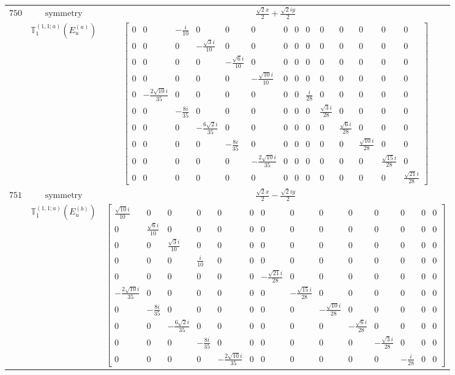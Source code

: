\documentclass[fleqn,8pt,landscape]{jsarticle}
\begin{document}
\begin{longtable}{ccc}
$ 750 $ & $ \text{symmetry} $ & $ \frac{\sqrt{2} x}{2} + \frac{\sqrt{2} i y}{2} $ \\
$  $ & $ \mathbb{T}_{1}^{(1,1;a)}(E_{u}^{(a)}) $ & $ \begin{bmatrix} 0 & 0 & - \frac{i}{10} & 0 & 0 & 0 & 0 & 0 & 0 & 0 & 0 & 0 & 0 & 0 \\ 0 & 0 & 0 & - \frac{\sqrt{3} i}{10} & 0 & 0 & 0 & 0 & 0 & 0 & 0 & 0 & 0 & 0 \\ 0 & 0 & 0 & 0 & - \frac{\sqrt{6} i}{10} & 0 & 0 & 0 & 0 & 0 & 0 & 0 & 0 & 0 \\ 0 & 0 & 0 & 0 & 0 & - \frac{\sqrt{10} i}{10} & 0 & 0 & 0 & 0 & 0 & 0 & 0 & 0 \\ 0 & - \frac{2 \sqrt{10} i}{35} & 0 & 0 & 0 & 0 & 0 & 0 & \frac{i}{28} & 0 & 0 & 0 & 0 & 0 \\ 0 & 0 & - \frac{8 i}{35} & 0 & 0 & 0 & 0 & 0 & 0 & \frac{\sqrt{3} i}{28} & 0 & 0 & 0 & 0 \\ 0 & 0 & 0 & - \frac{6 \sqrt{2} i}{35} & 0 & 0 & 0 & 0 & 0 & 0 & \frac{\sqrt{6} i}{28} & 0 & 0 & 0 \\ 0 & 0 & 0 & 0 & - \frac{8 i}{35} & 0 & 0 & 0 & 0 & 0 & 0 & \frac{\sqrt{10} i}{28} & 0 & 0 \\ 0 & 0 & 0 & 0 & 0 & - \frac{2 \sqrt{10} i}{35} & 0 & 0 & 0 & 0 & 0 & 0 & \frac{\sqrt{15} i}{28} & 0 \\ 0 & 0 & 0 & 0 & 0 & 0 & 0 & 0 & 0 & 0 & 0 & 0 & 0 & \frac{\sqrt{21} i}{28} \end{bmatrix} $ \\ \hline
$ 751 $ & $ \text{symmetry} $ & $ \frac{\sqrt{2} x}{2} - \frac{\sqrt{2} i y}{2} $ \\
$  $ & $ \mathbb{T}_{1}^{(1,1;a)}(E_{u}^{(b)}) $ & $ \begin{bmatrix} \frac{\sqrt{10} i}{10} & 0 & 0 & 0 & 0 & 0 & 0 & 0 & 0 & 0 & 0 & 0 & 0 & 0 \\ 0 & \frac{\sqrt{6} i}{10} & 0 & 0 & 0 & 0 & 0 & 0 & 0 & 0 & 0 & 0 & 0 & 0 \\ 0 & 0 & \frac{\sqrt{3} i}{10} & 0 & 0 & 0 & 0 & 0 & 0 & 0 & 0 & 0 & 0 & 0 \\ 0 & 0 & 0 & \frac{i}{10} & 0 & 0 & 0 & 0 & 0 & 0 & 0 & 0 & 0 & 0 \\ 0 & 0 & 0 & 0 & 0 & 0 & - \frac{\sqrt{21} i}{28} & 0 & 0 & 0 & 0 & 0 & 0 & 0 \\ - \frac{2 \sqrt{10} i}{35} & 0 & 0 & 0 & 0 & 0 & 0 & - \frac{\sqrt{15} i}{28} & 0 & 0 & 0 & 0 & 0 & 0 \\ 0 & - \frac{8 i}{35} & 0 & 0 & 0 & 0 & 0 & 0 & - \frac{\sqrt{10} i}{28} & 0 & 0 & 0 & 0 & 0 \\ 0 & 0 & - \frac{6 \sqrt{2} i}{35} & 0 & 0 & 0 & 0 & 0 & 0 & - \frac{\sqrt{6} i}{28} & 0 & 0 & 0 & 0 \\ 0 & 0 & 0 & - \frac{8 i}{35} & 0 & 0 & 0 & 0 & 0 & 0 & - \frac{\sqrt{3} i}{28} & 0 & 0 & 0 \\ 0 & 0 & 0 & 0 & - \frac{2 \sqrt{10} i}{35} & 0 & 0 & 0 & 0 & 0 & 0 & - \frac{i}{28} & 0 & 0 \end{bmatrix} $ \\ \hline

\end{longtable}
\end{document}
